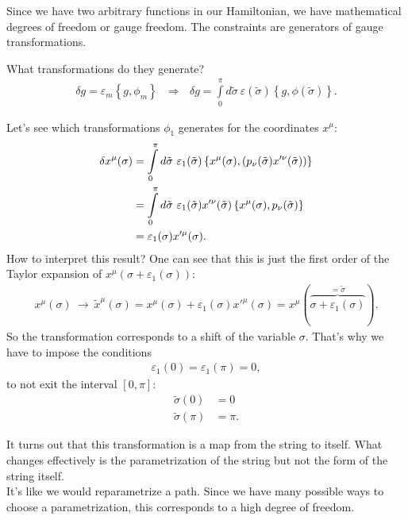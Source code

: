 Since we have two arbitrary functions in our Hamiltonian, we have mathematical degrees of freedom or gauge freedom. The constraints are generators of gauge transformations. 

What transformations do they generate?
\begin{align}
\delta g = \varepsilon_m \left\{ g,\phi_m \right\} \ \ \ \Longrightarrow \ \ \ \delta g = \displaystyle\int\limits_{0}^{\pi} d\tilde{\sigma} \ \varepsilon(\tilde{\sigma}) \left\{ g,\phi(\tilde{\sigma}) \right\}.
\end{align}

Let's see which transformations $\phi_1$ generates for the coordinates $x^{\mu}$:
\begin{align}
\delta x^{\mu}(\sigma) &=  \displaystyle\int\limits_{0}^{\pi} d\tilde{\sigma} \ \varepsilon_1(\tilde{\sigma}) \left \{ x^{\mu}(\sigma),(p_{\nu}(\tilde{\sigma}) x'^{\nu}(\tilde{\sigma}) ) \right \} \notag \\
&=  \displaystyle\int\limits_{0}^{\pi} d\tilde{\sigma} \ \varepsilon_1(\tilde{\sigma}) x'^{\nu}(\tilde{\sigma}) \left \{ x^{\mu}(\sigma),p_{\nu}(\tilde{\sigma}) \right \} \notag \\
&= \varepsilon_1(\sigma) x'^{\mu}(\sigma) .
\end{align}
How to interpret this result? One can see that this is just the first order of the Taylor expansion of $x^{\mu}(\sigma + \varepsilon_1(\sigma))$:
\begin{align}
x^{\mu}(\sigma) \ \longrightarrow \ \tilde{x}^{\mu}(\sigma) = x^{\mu}(\sigma) + \varepsilon_1(\sigma) x'^{\mu}(\sigma) = x^{\mu}(\overbrace{\sigma + \varepsilon_1(\sigma)}^{= \tilde{\sigma}}).
\end{align}
So the transformation corresponds to a shift of the variable $\sigma$. That's why we have to impose the conditions
\begin{align}
\varepsilon_1(0) = \varepsilon_1(\pi) = 0,
\end{align}
to not exit the interval $[0,\pi]$:
\begin{align}
\tilde{\sigma}(0) &= 0 \\
\tilde{\sigma}(\pi) &= \pi.
\end{align}

It turns out that this transformation is a map from the string to itself. What changes effectively is the parametrization of the string but not the form of the string itself. \\
It's like we would reparametrize a path. Since we have many possible ways to choose a parametrization, this corresponds to a high degree of freedom. \\

